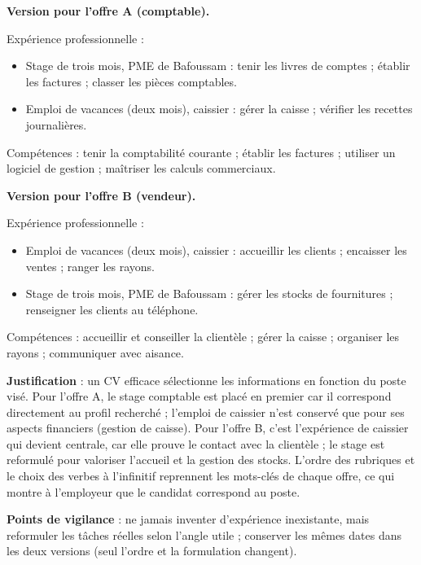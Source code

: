\documentclass[11pt]{article}
\begin{document}
\begin{corrige}
\textbf{Version pour l'offre A (comptable).}

Expérience professionnelle :
\begin{itemize}
\item Stage de trois mois, PME de Bafoussam : tenir les livres de comptes ; établir les factures ; classer les pièces comptables.
\item Emploi de vacances (deux mois), caissier : gérer la caisse ; vérifier les recettes journalières.
\end{itemize}
Compétences : tenir la comptabilité courante ; établir les factures ; utiliser un logiciel de gestion ; maîtriser les calculs commerciaux.

\textbf{Version pour l'offre B (vendeur).}

Expérience professionnelle :
\begin{itemize}
\item Emploi de vacances (deux mois), caissier : accueillir les clients ; encaisser les ventes ; ranger les rayons.
\item Stage de trois mois, PME de Bafoussam : gérer les stocks de fournitures ; renseigner les clients au téléphone.
\end{itemize}
Compétences : accueillir et conseiller la clientèle ; gérer la caisse ; organiser les rayons ; communiquer avec aisance.

\textbf{Justification} : un CV efficace sélectionne les informations en fonction du poste visé. Pour l'offre A, le stage comptable est placé en premier car il correspond directement au profil recherché ; l'emploi de caissier n'est conservé que pour ses aspects financiers (gestion de caisse). Pour l'offre B, c'est l'expérience de caissier qui devient centrale, car elle prouve le contact avec la clientèle ; le stage est reformulé pour valoriser l'accueil et la gestion des stocks. L'ordre des rubriques et le choix des verbes à l'infinitif reprennent les mots-clés de chaque offre, ce qui montre à l'employeur que le candidat correspond au poste.

\textbf{Points de vigilance} : ne jamais inventer d'expérience inexistante, mais reformuler les tâches réelles selon l'angle utile ; conserver les mêmes dates dans les deux versions (seul l'ordre et la formulation changent).
\end{corrige}
\end{document}
